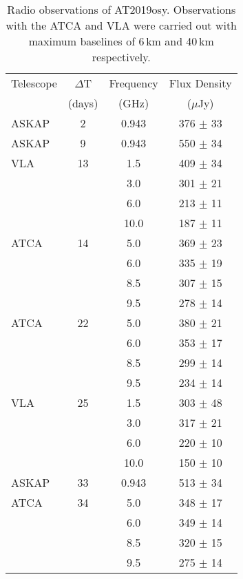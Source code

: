 \begin{table*}
\caption[Radio observations of AT2019osy.]{Radio observations of AT2019osy. Observations with the ATCA and VLA were carried out with maximum baselines of 6\,km and 40\,km respectively.}
\label{tab:at2019osy_radio}
\centering
\begin{threeparttable}
\begin{tabular}{lccc}
\hline\hline
Telescope & $\Delta $T & Frequency & Flux Density\\
 & (days) & (GHz) & ($\mu$Jy)\\
\hline
        ASKAP & 2 & 0.943 & 376 $\pm$ 33 \\
        \hline
        ASKAP & 9 & 0.943 & 550 $\pm$ 34 \\
        \hline
        VLA & 13 & 1.5 & 409 $\pm$ 34 \\
         & & 3.0 & 301 $\pm$ 21\\
         & & 6.0 & 213 $\pm$ 11\\
         & & 10.0 & 187 $\pm$ 11\\
        \hline
        ATCA & 14 & 5.0 & 369 $\pm$ 23 \\
         & & 6.0 & 335 $\pm$ 19\\
         & & 8.5 & 307 $\pm$ 15\\
         & & 9.5 & 278 $\pm$ 14\\
        \hline
        ATCA & 22 & 5.0 & 380 $\pm$ 21 \\
         & & 6.0 & 353 $\pm$ 17\\
         & & 8.5 & 299 $\pm$ 14\\
         & & 9.5 & 234 $\pm$ 14\\
        \hline
        VLA & 25 & 1.5 & 303 $\pm$ 48\\
         & & 3.0 & 317 $\pm$ 21\\
         & & 6.0 & 220 $\pm$ 10\\
         & & 10.0 & 150 $\pm$ 10\\
        \hline
        ASKAP & 33 & 0.943 & 513 $\pm$ 34\\
        \hline
        ATCA & 34 & 5.0 & 348 $\pm$ 17\\
         & & 6.0 & 349 $\pm$ 14\\
         & & 8.5 & 320 $\pm$ 15\\
         & & 9.5 & 275 $\pm$ 14\\
\hline\hline
\end{tabular}
\end{threeparttable}
\end{table*}